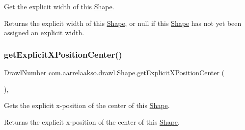 Get the explicit width of this \hyperlink{classcom_1_1aarrelaakso_1_1drawl_1_1_shape}{Shape}. 

\begin{DoxyReturn}{Returns}
the explicit width of this \hyperlink{classcom_1_1aarrelaakso_1_1drawl_1_1_shape}{Shape}, or {\ttfamily null} if this \hyperlink{classcom_1_1aarrelaakso_1_1drawl_1_1_shape}{Shape} has not yet been assigned an explicit width. 
\end{DoxyReturn}
\mbox{\label{classcom_1_1aarrelaakso_1_1drawl_1_1_shape_aaecae2f51794b77ff2f76b1be64b0d90}} 
\subsubsection{\texorpdfstring{get\+Explicit\+X\+Position\+Center()}{getExplicitXPositionCenter()}}
{\footnotesize\ttfamily \hyperlink{classcom_1_1aarrelaakso_1_1drawl_1_1_drawl_number}{Drawl\+Number} com.\+aarrelaakso.\+drawl.\+Shape.\+get\+Explicit\+X\+Position\+Center (\begin{DoxyParamCaption}{ }\end{DoxyParamCaption})\hspace{0.3cm}{\ttfamily [protected]}, {\ttfamily [inherited]}}



Gets the explicit x-\/position of the center of this \hyperlink{classcom_1_1aarrelaakso_1_1drawl_1_1_shape}{Shape}. 

\begin{DoxyReturn}{Returns}
the explicit x-\/position of the center of this \hyperlink{classcom_1_1aarrelaakso_1_1drawl_1_1_shape}{Shape}. 
\end{DoxyReturn}
\mbox{\label{classcom_1_1aarrelaakso_1_1drawl_1_1_shape_a339cf8811f57b7cb5251109b04be953c}} 
